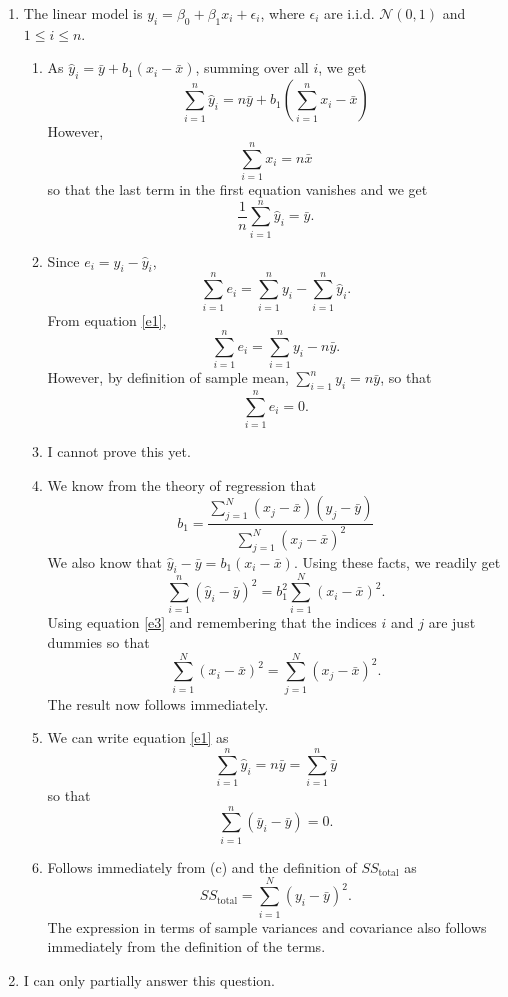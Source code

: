 \documentclass{article}
\begin{document}
\begin{enumerate}
\item The linear model is $y_i = \beta_0 + \beta_1 x_i + \epsilon_i$,
where $\epsilon_i$ are i.i.d. $\mathcal{N}(0, 1)$ and $1 \le i \le n$.
\begin{enumerate}
\item As $\hat{y}_i = \bar{y} + b_1(x_i - \bar{x})$, summing over all $i$,
we get
\[
    \sum_{i=1}^n\hat{y}_i = n\bar{y} + b_1\left(\sum_{i=1}^nx_i - \bar{x}\right)
\]
However,
\[
    \sum_{i=1}^n x_i = n\bar{x}
\]
so that the last term in the first equation vanishes and we get
\begin{equation}\label{e1}
    \frac{1}{n}\sum_{i=1}^n\hat{y}_i = \bar{y}.
\end{equation}
\item Since $e_i = y_i - \hat{y}_i$,
\[
    \sum_{i=1}^ne_i = \sum_{i=1}^ny_i - \sum_{i=1}^n\hat{y}_i.
\]
From equation \eqref{e1},
\[
    \sum_{i=1}^ne_i = \sum_{i=1}^ny_i - n\bar{y}.
\]
However, by definition of sample mean, $\sum_{i=1}^n y_i = n\bar{y}$,
so that
\begin{equation}\label{e2}
\sum_{i=1}^n e_i = 0.
\end{equation}
\item I cannot prove this yet.
\item We know from the theory of regression that
\begin{equation}\label{e3}
b_1 = \frac{\sum_{j=1}^N(x_j - \bar{x})(y_j - \bar{y})}{\sum_{j=1}^N(x_j - \bar{x})^2}
\end{equation}
We also know that $\hat{y}_i - \bar{y} = b_1(x_i - \bar{x})$. Using these facts, we 
readily get
\[
\sum_{i=1}^n(\hat{y}_i - \bar{y})^2 = b_1^2\sum_{i=1}^N(x_i - \bar{x})^2.
\]
Using equation \eqref{e3} and remembering that the indices $i$ and $j$ are just dummies
so that
\[
\sum_{i=1}^N(x_i - \bar{x})^2 = \sum_{j=1}^N(x_j - \bar{x})^2.
\]
The result now follows immediately.
\item We can write equation \eqref{e1} as
\[
    \sum_{i=1}^n \hat{y}_i = n\bar{y} = \sum_{i=1}^n\bar{y}
\]
so that
\[
    \sum_{i=1}^n(\bar{y}_i - \bar{y}) = 0.
\]
\item Follows immediately from (c) and the definition of $SS_{\text{total}}$ as
\[
    SS_{\text{total}} = \sum_{i=1}^N(y_i - \bar{y})^2.
\]
The expression in terms of sample variances and covariance also follows immediately
from the definition of the terms.
\end{enumerate}
\item I can only partially answer this question.

\end{enumerate}
\end{document}

